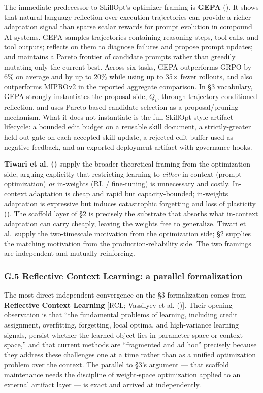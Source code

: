 \documentclass[
]{article}
\begin{document}
The immediate predecessor to SkillOpt's optimizer framing is
\textbf{GEPA} (). It
shows that natural-language reflection over execution trajectories can
provide a richer adaptation signal than sparse scalar rewards for prompt
evolution in compound AI systems. GEPA samples trajectories containing
reasoning steps, tool calls, and tool outputs; reflects on them to
diagnose failures and propose prompt updates; and maintains a Pareto
frontier of candidate prompts rather than greedily mutating only the
current best. Across six tasks, GEPA outperforms GRPO by 6\% on average
and by up to 20\% while using up to 35× fewer rollouts, and also
outperforms MIPROv2 in the reported aggregate comparison. In §3
vocabulary, GEPA strongly instantiates the proposal side, \(Q_t\),
through trajectory-conditioned reflection, and uses Pareto-based
candidate selection as a proposal/pruning mechanism. What it does not
instantiate is the full SkillOpt-style artifact lifecycle: a bounded
edit budget on a reusable skill document, a strictly-greater held-out
gate on each accepted skill update, a rejected-edit buffer used as
negative feedback, and an exported deployment artifact with governance
hooks.

\textbf{Tiwari et al. ()}
supply the broader theoretical framing from the optimization side,
arguing explicitly that restricting learning to \emph{either} in-context
(prompt optimization) \emph{or} in-weights (RL / fine-tuning) is
unnecessary and costly. In-context adaptation is cheap and rapid but
capacity-bounded; in-weights adaptation is expressive but induces
catastrophic forgetting and loss of plasticity
(). The scaffold
layer of §2 is precisely the substrate that absorbs what in-context
adaptation can carry cheaply, leaving the weights free to generalize.
Tiwari et al.~supply the two-timescale motivation from the optimization
side; §2 supplies the matching motivation from the
production-reliability side. The two framings are independent and
mutually reinforcing.

\subsubsection{G.5 Reflective Context Learning: a parallel
formalization}\label{g.5-reflective-context-learning-a-parallel-formalization}

The most direct independent convergence on the §3 formalization comes
from \textbf{Reflective Context Learning} {[}RCL; Vassilyev et al.
(){]}. Their opening observation is
that ``the fundamental problems of learning, including credit
assignment, overfitting, forgetting, local optima, and high-variance
learning signals, persist whether the learned object lies in parameter
space or context space,'' and that current methods are ``fragmented and
ad hoc'' precisely because they address these challenges one at a time
rather than as a unified optimization problem over the context. The
parallel to §3's argument --- that scaffold maintenance needs the
discipline of weight-space optimization applied to an external artifact
layer --- is exact and arrived at independently.
\end{document}
